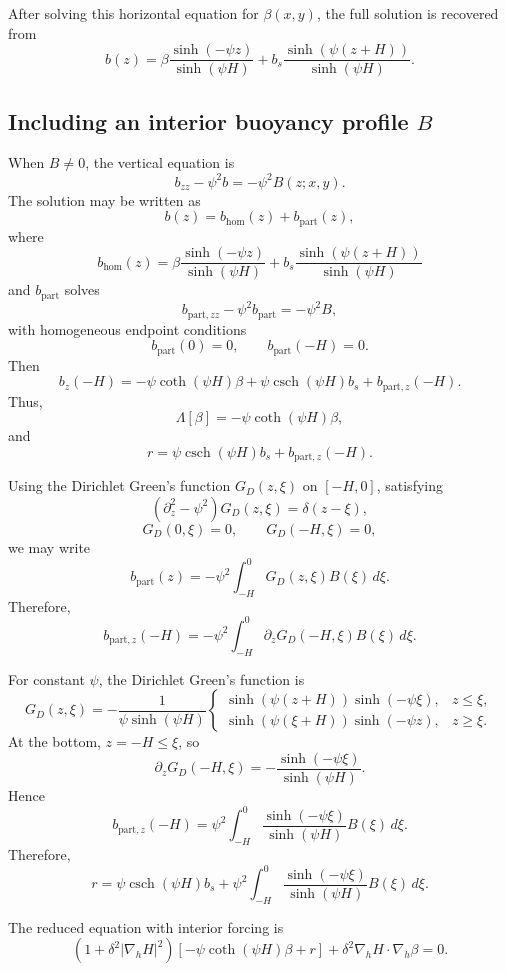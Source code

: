 \documentclass[11pt]{amsart}
\begin{document}
After solving this horizontal equation for \(\beta(x,y)\), the full solution is recovered from
\[
\boxed{
b(z)
=
\beta
\frac{\sinh(-\psi z)}{\sinh(\psi H)}
+
b_s
\frac{\sinh(\psi(z+H))}{\sinh(\psi H)}.
}
\]

\subsection{Including an interior buoyancy profile \(B\)}

When \(B\neq 0\), the vertical equation is
\[
b_{zz}-\psi^2 b=-\psi^2 B(z;x,y).
\]
The solution may be written as
\[
b(z)
=
b_{\mathrm{hom}}(z)
+
b_{\mathrm{part}}(z),
\]
where
\[
b_{\mathrm{hom}}(z)
=
\beta
\frac{\sinh(-\psi z)}{\sinh(\psi H)}
+
b_s
\frac{\sinh(\psi(z+H))}{\sinh(\psi H)}
\]
and \(b_{\mathrm{part}}\) solves
\[
b_{\mathrm{part},zz}-\psi^2 b_{\mathrm{part}}
=
-\psi^2 B,
\]
with homogeneous endpoint conditions
\[
b_{\mathrm{part}}(0)=0,
\qquad
b_{\mathrm{part}}(-H)=0.
\]
Then
\[
b_z(-H)
=
-\psi \coth(\psi H)\beta
+
\psi \operatorname{csch}(\psi H)b_s
+
b_{\mathrm{part},z}(-H).
\]
Thus,
\[
\Lambda[\beta]
=
-\psi \coth(\psi H)\beta,
\]
and
\[
r=
\psi \operatorname{csch}(\psi H)b_s
+
b_{\mathrm{part},z}(-H).
\]

Using the Dirichlet Green's function \(G_D(z,\xi)\) on \([-H,0]\), satisfying
\[
\left(\partial_z^2-\psi^2\right)G_D(z,\xi)
=
\delta(z-\xi),
\]
\[
G_D(0,\xi)=0,
\qquad
G_D(-H,\xi)=0,
\]
we may write
\[
b_{\mathrm{part}}(z)
=
-\psi^2 \int_{-H}^{0} G_D(z,\xi)B(\xi)\,d\xi.
\]
Therefore,
\[
b_{\mathrm{part},z}(-H)
=
-\psi^2 \int_{-H}^{0} \partial_z G_D(-H,\xi)B(\xi)\,d\xi.
\]

For constant \(\psi\), the Dirichlet Green's function is
\[
G_D(z,\xi)
=
-\frac{1}{\psi\sinh(\psi H)}
\begin{cases}
\sinh\left(\psi(z+H)\right)\sinh(-\psi \xi),
& z\le \xi,\\[4pt]
\sinh\left(\psi(\xi+H)\right)\sinh(-\psi z),
& z\ge \xi.
\end{cases}
\]
At the bottom, \(z=-H\le \xi\), so
\[
\partial_z G_D(-H,\xi)
=
-\frac{\sinh(-\psi \xi)}{\sinh(\psi H)}.
\]
Hence
\[
b_{\mathrm{part},z}(-H)
=
\psi^2
\int_{-H}^{0}
\frac{\sinh(-\psi \xi)}{\sinh(\psi H)}
B(\xi)\,d\xi.
\]
Therefore,
\[
\boxed{
r
=
\psi \operatorname{csch}(\psi H)b_s
+
\psi^2
\int_{-H}^{0}
\frac{\sinh(-\psi \xi)}{\sinh(\psi H)}
B(\xi)\,d\xi.
}
\]

The reduced equation with interior forcing is
\[
\boxed{
\left(1+\delta^2 |\nabla_h H|^2\right)
\left[
-\psi \coth(\psi H)\beta
+
r
\right]
+
\delta^2 \nabla_h H\cdot \nabla_h \beta
=0.
}
\]
\end{document}
